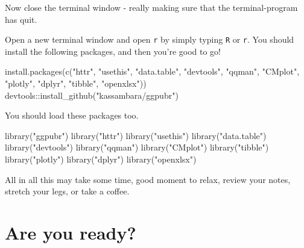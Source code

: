 \documentclass[
]{book}
\newenvironment{Shaded}{\begin{snugshade}}{\end{snugshade}}
\newcommand{\FunctionTok}[1]{\textcolor[rgb]{0.00,0.00,0.00}{#1}}
\newcommand{\NormalTok}[1]{#1}
\newcommand{\SpecialCharTok}[1]{\textcolor[rgb]{0.00,0.00,0.00}{#1}}
\newcommand{\StringTok}[1]{\textcolor[rgb]{0.31,0.60,0.02}{#1}}
\begin{document}
Now close the terminal window - really making sure that the terminal-program has quit.

Open a new terminal window and open \texttt{r} by simply typing \texttt{R} or \texttt{r}. You should install the following packages, and then you're good to go!

\begin{Shaded}
\begin{Highlighting}[]
\FunctionTok{install.packages}\NormalTok{(}\FunctionTok{c}\NormalTok{(}\StringTok{"httr"}\NormalTok{, }\StringTok{"usethis"}\NormalTok{, }\StringTok{"data.table"}\NormalTok{, }\StringTok{"devtools"}\NormalTok{, }
                   \StringTok{"qqman"}\NormalTok{, }\StringTok{"CMplot"}\NormalTok{, }\StringTok{"plotly"}\NormalTok{, }
                   \StringTok{"dplyr"}\NormalTok{, }\StringTok{"tibble"}\NormalTok{, }\StringTok{"openxlsx"}\NormalTok{))}
\NormalTok{devtools}\SpecialCharTok{::}\FunctionTok{install\_github}\NormalTok{(}\StringTok{"kassambara/ggpubr"}\NormalTok{)}
\end{Highlighting}
\end{Shaded}

You should load these packages too.

\begin{Shaded}
\begin{Highlighting}[]
\FunctionTok{library}\NormalTok{(}\StringTok{"ggpubr"}\NormalTok{)}
\FunctionTok{library}\NormalTok{(}\StringTok{"httr"}\NormalTok{)}
\FunctionTok{library}\NormalTok{(}\StringTok{"usethis"}\NormalTok{)}
\FunctionTok{library}\NormalTok{(}\StringTok{"data.table"}\NormalTok{)}
\FunctionTok{library}\NormalTok{(}\StringTok{"devtools"}\NormalTok{)}
\FunctionTok{library}\NormalTok{(}\StringTok{"qqman"}\NormalTok{)}
\FunctionTok{library}\NormalTok{(}\StringTok{"CMplot"}\NormalTok{)}
\FunctionTok{library}\NormalTok{(}\StringTok{"tibble"}\NormalTok{)}
\FunctionTok{library}\NormalTok{(}\StringTok{"plotly"}\NormalTok{)}
\FunctionTok{library}\NormalTok{(}\StringTok{"dplyr"}\NormalTok{)}
\FunctionTok{library}\NormalTok{(}\StringTok{"openxlsx"}\NormalTok{)}
\end{Highlighting}
\end{Shaded}

All in all this may take some time, good moment to relax, review your notes, stretch your legs, or take a coffee.

\hypertarget{are-you-ready}{%
\section{Are you ready?}\label{are-you-ready}}
\end{document}
